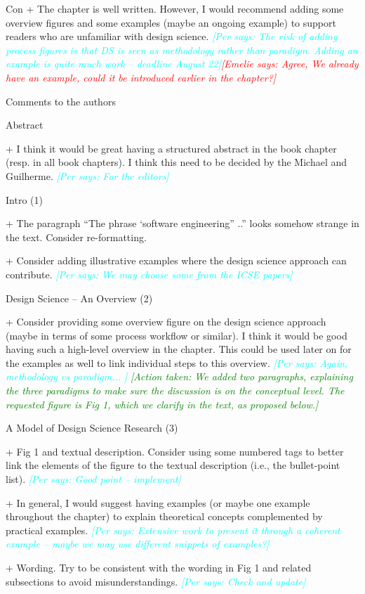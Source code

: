 \documentclass{article}
\newcommand{\emelie}[1]{\textcolor{red}{{\it [Emelie says: #1]}}}
\newcommand{\per}[1]{\textcolor{cyan}{{\it [Per says: #1]}}}
\newcommand{\action}[1]{\textcolor{green}{{\it [Action taken: #1]}}}
\newcommand{\emelie}[1]{}
\newcommand{\per}[1]{}
\newcommand{\action}[1]{}
\begin{document}
Con
+ The chapter is well written. However, I would recommend adding some overview figures and some examples (maybe an ongoing example) to support readers who are unfamiliar with design science. \per{The risk of adding process figures is that DS is seen as methodology rather than paradigm. Adding an example is quite much work -- deadline August 22}\emelie{Agree, We already have an example, could it be introduced earlier in the chapter?}

Comments to the authors

Abstract

+ I think it would be great having a structured abstract in the book chapter (resp. in all book chapters). I think this need to be decided by the Michael and Guilherme. \per{For the editors}

Intro (1)

+ The paragraph “The phrase ‘software engineering” ..” looks somehow strange in the text. Consider re-formatting.

+ Consider adding illustrative examples where the design science approach can contribute. \per{We may choose some from the ICSE papers}

Design Science – An Overview (2)

+ Consider providing some overview figure on the design science approach (maybe in terms of some process workflow or similar). I think it would be good having such a high-level overview in the chapter. This could be used later on for the examples as well to link individual steps to this overview. \per{Again, methodology vs paradigm... }
\action{We added two paragraphs, explaining the three paradigms to make sure the discussion is on the conceptual level. The requested figure is Fig 1, which we clarify in the text, as proposed below.}

A Model of Design Science Research (3)

+ Fig 1 and textual description. Consider using some numbered tags to better link the elements of the figure to the textual description (i.e., the bullet-point list). \per{Good point -- implement}

+ In general, I would suggest having examples (or maybe one example throughout the chapter) to explain theoretical concepts complemented by practical examples. \per{Extensive work to present it through a coherent example -- maybe we may use different snippets of examples?}

+ Wording. Try to be consistent with the wording in Fig 1 and related subsections to avoid misunderstandings. \per{Check and update}
\end{document}
